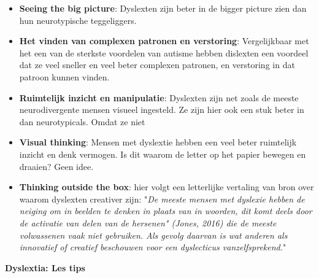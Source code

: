 \documentclass{article}
\begin{document}
                    \begin{itemize}
                        \item \textbf{Seeing the big picture}\cite{dyslextia-struggles-and-superpowers}:
                            Dyslexten zijn beter in de bigger picture zien dan hun neurotypische teggeliggers.
                        \item \textbf{Het vinden van complexen patronen en verstoring}\cite{dyslextia-struggles-and-superpowers}:
                            Vergelijkbaar met het een van de sterkste voordelen van autisme hebben dislexten een voordeel dat ze veel sneller en veel beter complexen patronen, en verstoring in dat patroon kunnen vinden.
                        \item \textbf{Ruimtelijk inzicht en manipulatie}\cite{dyslextia-struggles-and-superpowers}:
                            Dyslexten zijn net zoals de meeste neurodivergente mensen visueel ingesteld. Ze zijn hier ook een stuk beter in dan neurotypicals. Omdat ze niet 
                        \item \textbf{Visual thinking}\cite{dyslextia-struggles-and-superpowers}:
                            Mensen met dyslextie hebben een veel beter ruimtelijk inzicht en denk vermogen. Is dit waarom de letter op het papier bewegen en draaien? Geen idee.
                        \item {\textbf{Thinking outside the box}\cite{dyslextia-struggles-and-superpowers}:
                            hier volgt een letterlijke vertaling van bron \cite{Creativity-and-Dyslexia} over waarom dyslexten creativer zijn:
                            {"\textit{De meeste mensen met dyslexie hebben de neiging om in beelden te denken in plaats van in woorden, dit komt deels door de activatie van delen van de hersenen" (Jones, 2016) die de meeste volwassenen vaak niet gebruiken. Als gevolg daarvan is wat anderen als innovatief of creatief beschouwen voor een dyslecticus vanzelfsprekend.}"}
                            }
                    \end{itemize}
                    \bigskip
                \noindent\textbf{Dyslextia: Les tips}
\end{document}
